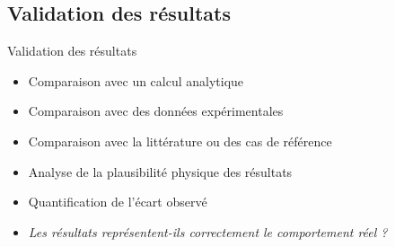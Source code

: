 \subsection{Validation des résultats}
\label{sec:Validation des résultats}

\begin{frame}[c]{Validation des résultats}


\begin{itemize}
    \item Comparaison avec un calcul analytique
    \item Comparaison avec des données expérimentales
    \item Comparaison avec la littérature ou des cas de référence
    \item Analyse de la plausibilité physique des résultats
    \item Quantification de l'écart observé
    \item \textit{Les résultats représentent-ils correctement le comportement réel ?}
\end{itemize}

\end{frame}